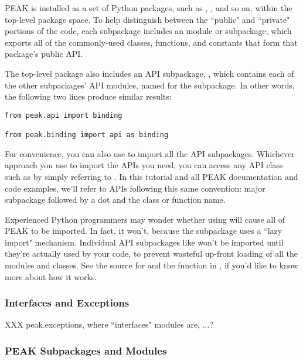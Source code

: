 PEAK is installed as a set of Python packages, such as ,
, and so on, within the top-level  package
space.  To help distinguish between the ``public" and ``private" portions of
the code, each subpackage includes an  module or subpackage, which
exports all of the commonly-used classes, functions, and constants that form
that package's public API.

The top-level package also includes an API subpackage, , which
contains each of the other subpackages' API modules, named for the subpackage.
In other words, the following two lines produce similar results:

\begin{verbatim}
from peak.api import binding

from peak.binding import api as binding
\end{verbatim}

For convenience, you can also use  to import all
the API subpackages.  Whichever approach you use to import the APIs you need,
you can access any  API class such as 
by simply referring to .  In this tutorial and all PEAK
documentation and code examples, we'll refer to APIs following this same
convention: major subpackage followed by a dot and the class or function name.

\begin{notice}
Experienced Python programmers may wonder whether using
 will cause all of PEAK to be imported.  In
fact, it won't, because the  subpackage uses a 
``lazy import" mechanism.  Individual API subpackages like 
won't be imported until they're actually used by your code, to prevent wasteful
up-front loading of all the modules and classes.  See the source for
 and the  function in
, if you'd like to know more about how it works.
\end{notice} 



\subsubsection{Interfaces and Exceptions}

XXX peak.exceptions, where ``interfaces" modules are, ...?

\subsubsection{PEAK Subpackages and Modules}

